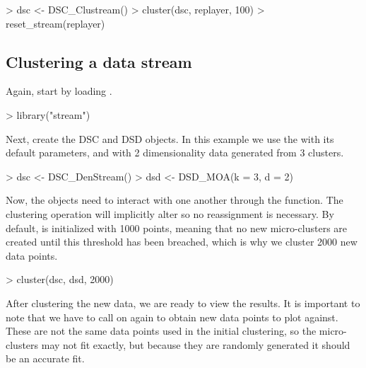 \documentclass[nojss]{jss}
\begin{document}
\begin{Schunk}
\begin{Sinput}
> dsc <- DSC_Clustream()
> cluster(dsc, replayer, 100)
> reset_stream(replayer)
\end{Sinput}
\end{Schunk}

\subsection{Clustering a data stream}
\label{examples:clustering_ds}

Again, start by loading .

\begin{Schunk}
\begin{Sinput}
> library("stream")
\end{Sinput}
\end{Schunk}

Next, create the DSC and DSD objects. In this example we use the  with its default parameters, and  with 2 dimensionality data generated from 3 clusters.

\begin{Schunk}
\begin{Sinput}
> dsc <- DSC_DenStream()
> dsd <- DSD_MOA(k = 3, d = 2)
\end{Sinput}
\end{Schunk}

Now, the objects need to interact with one another through the  function. The clustering operation will implicitly alter  so no reassignment is necessary. By default,  is initialized with 1000 points, meaning that no new micro-clusters are created until this threshold has been breached, which is why we cluster 2000 new data points.

\begin{Schunk}
\begin{Sinput}
> cluster(dsc, dsd, 2000)
\end{Sinput}
\end{Schunk}

After clustering the new data, we are ready to view the results. It is important to note that we have to call  on  again to obtain new data points to plot against. These are not the same data points used in the initial clustering, so the micro-clusters may not fit exactly, but because they are randomly generated it should be an accurate fit.
\end{document}
